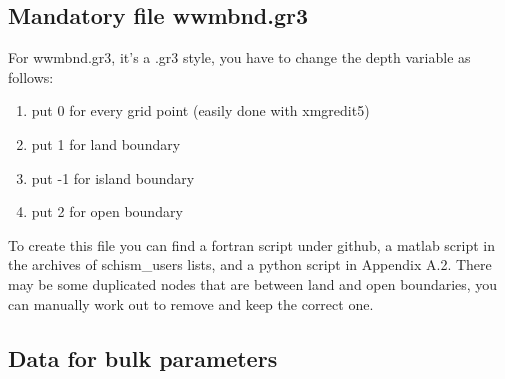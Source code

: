 \documentclass[preprints,briefreport,accept,oneauthor,pdftex]{Definitions/mdpi}
\begin{document}
\subsection{Mandatory file wwmbnd.gr3}
\noindent For wwmbnd.gr3, it's a .gr3 style, you have to change the depth variable as follows:
\begin{enumerate}
    \item put 0 for every grid point (easily done with xmgredit5)
    \item put 1 for land boundary
    \item put -1 for island boundary
    \item put 2 for open boundary
\end{enumerate}
To create this file you can find a fortran script under github, a matlab script in the archives of schism\_users lists, and a python script in Appendix A.2.
There may be some duplicated nodes that are between land and open boundaries, you can manually work out to remove and keep the correct one.\\
\subsection{Data for bulk parameters}
\end{document}
